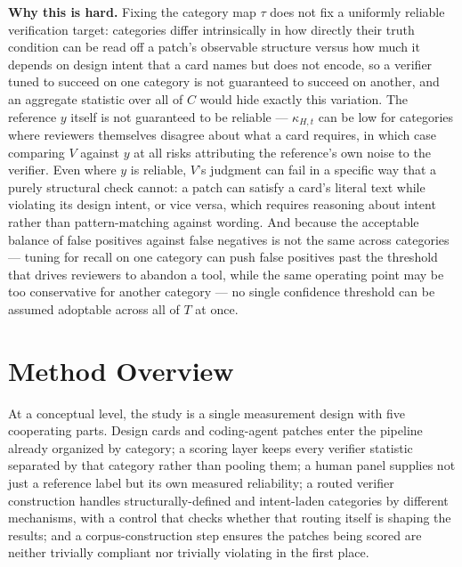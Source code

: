\documentclass[11pt]{article}
\begin{document}
\noindent\textbf{Why this is hard.} Fixing the category map $\tau$ does not fix a uniformly reliable verification target: categories differ intrinsically in how directly their truth condition can be read off a patch's observable structure versus how much it depends on design intent that a card names but does not encode, so a verifier tuned to succeed on one category is not guaranteed to succeed on another, and an aggregate statistic over all of $C$ would hide exactly this variation. The reference $y$ itself is not guaranteed to be reliable --- $\kappa_{H,t}$ can be low for categories where reviewers themselves disagree about what a card requires, in which case comparing $V$ against $y$ at all risks attributing the reference's own noise to the verifier. Even where $y$ is reliable, $V$'s judgment can fail in a specific way that a purely structural check cannot: a patch can satisfy a card's literal text while violating its design intent, or vice versa, which requires reasoning about intent rather than pattern-matching against wording. And because the acceptable balance of false positives against false negatives is not the same across categories --- tuning for recall on one category can push false positives past the threshold that drives reviewers to abandon a tool, while the same operating point may be too conservative for another category --- no single confidence threshold can be assumed adoptable across all of $T$ at once.

\section{Method Overview}

At a conceptual level, the study is a single measurement design with five cooperating parts. Design cards and coding-agent patches enter the pipeline already organized by category; a scoring layer keeps every verifier statistic separated by that category rather than pooling them; a human panel supplies not just a reference label but its own measured reliability; a routed verifier construction handles structurally-defined and intent-laden categories by different mechanisms, with a control that checks whether that routing itself is shaping the results; and a corpus-construction step ensures the patches being scored are neither trivially compliant nor trivially violating in the first place.
\end{document}
